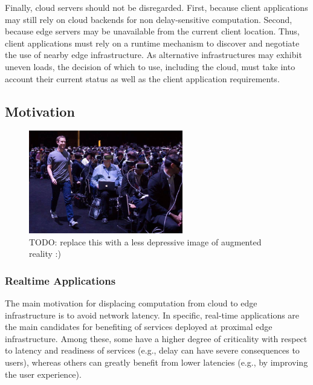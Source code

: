 
Finally, cloud servers should not be disregarded. First, because client applications may still rely on cloud backends for non delay-sensitive computation. Second, because edge servers may be unavailable from the current client location. Thus, client applications must rely on a runtime mechanism to discover and negotiate the use of nearby edge infrastructure. As alternative infrastructures may exhibit uneven loads, the decision of which to use, including the cloud, must take into account their current status as well as the client application requirements. 



\subsection{Motivation}

\begin{figure}
	\includegraphics[width=0.6\textwidth]{figs/augmented-reality.jpg}
	\caption{TODO: replace this with a less depressive image of augmented reality :)}
	\label{fig:augmented-reality}
\end{figure}

\subsubsection{Realtime Applications}

The main motivation for displacing computation from cloud to edge infrastructure is to avoid network latency. In specific, real-time applications are the main candidates for benefiting of services deployed at proximal edge infrastructure. Among these, some have a higher degree of criticality with respect to latency and readiness of services (e.g., delay can have severe consequences to users), whereas others can greatly benefit from lower latencies (e.g., by improving the user experience).

